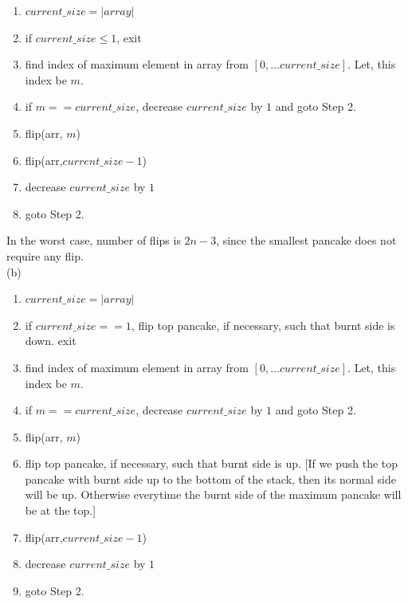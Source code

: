 \documentclass[assign]{article}
\begin{document}
\begin{center}
\begin{enumerate}
  \item $current\_size = \left|array\right|$
  \item if $current\_size \le 1$, exit
  \item find index of maximum element in array from $[0, \dots current\_size]$. Let, this index be $m$.
   \item if $m == current\_size$, decrease $current\_size$ by $1$ and goto Step 2.
   \item flip(arr, $m$)
   \item flip(arr,$current\_size-1$)
    \item decrease $current\_size$ by $1$
    \item goto Step 2.
\end{enumerate}
\end{center}

\noindent In the worst case, number of flips is $2n-3$, since the smallest pancake does not require any flip. \\

 (b)


\begin{center}
\begin{enumerate}
  \item $current\_size = \left|array\right|$
  \item if $current\_size == 1$, flip top pancake, if necessary, such that burnt side is down. exit
  \item find index of maximum element in array from $[0, \dots current\_size]$. Let, this index be $m$.
   \item if $m == current\_size$, decrease $current\_size$ by $1$ and goto Step 2.
   \item flip(arr, $m$)
   \item flip top pancake, if necessary, such that burnt side is up. [If we push the top pancake with burnt side up to the bottom of the stack, then its normal side will be up. Otherwise everytime the burnt side of the maximum pancake will be at the top.]
   \item flip(arr,$current\_size-1$)
    \item decrease $current\_size$ by $1$
    \item goto Step 2.
\end{enumerate}
\end{center}
\end{document}
